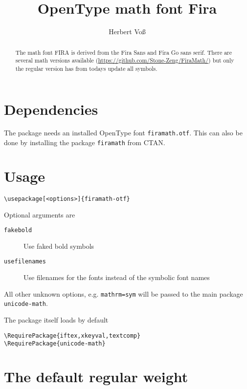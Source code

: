 \documentclass[english,log-declarations=false]{article}
\title{OpenType math font Fira}
\author{Herbert Voß}
\def\Lcs#1{\texttt{\textbackslash #1}}
\begin{document}
\maketitle

\tableofcontents


\begin{abstract}
The math font FIRA is derived from the Fira Sans and Fira Go sans serif.
There are several math versions available (\url{https://github.com/Stone-Zeng/FiraMath/}) but
only the regular version has from todays update all symbols. 
\end{abstract}


\section{Dependencies}
The package needs an installed OpenType font \texttt{firamath.otf}. This can also be done
by installing the package \texttt{firamath}  from CTAN.~\cite{ctan-firamath}

\section{Usage}

\begin{verbatim}
\usepackage[<options>]{firamath-otf}
\end{verbatim}

Optional arguments are 

\begin{description}
\item[\texttt{fakebold}] Use faked bold symbols 
\item[\texttt{usefilenames}] Use filenames for the fonts instead of the symbolic font names
\end{description}

All other unknown options, e.g. \verb|mathrm=sym| will be passed to the main package \texttt{unicode-math}.


The package itself loads by default

\begin{verbatim}
\RequirePackage{iftex,xkeyval,textcomp}
\RequirePackage{unicode-math}
\end{verbatim}




\section{The default regular weight}
\end{document}
